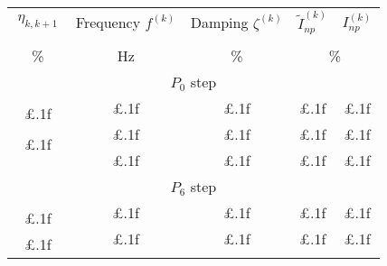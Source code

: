 \documentclass[11pt]{article}
\begin{document}
\renewcommand{\tabcolsep}{10 pt}
\renewcommand{\arraystretch}{.55}




\begin{table}
\centering
\begin{tabular}{|ccccc|}
\hline
\multicolumn{1}{|c|}{\multirow{2.5}{*}{$\ \eta_{k, k+1}\ $}} & 
\multicolumn{1}{c|}{\multirow{2.5}{*}{Frequency $f^{(k)}$}} & 
\multicolumn{1}{c|}{\multirow{2.5}{*}{Damping $\zeta^{(k)}$}} & 
\multicolumn{1}{c}{\multirow{2.5}{*}{$\tilde I_{np}^{(k)}$}} & 
\multirow{2.5}{*}{$I_{np}^{(k)}$} \\
\multicolumn{1}{|c|}{} & \multicolumn{1}{c|}{} & \multicolumn{1}{c|}{} & \multicolumn{2}{c|}{} \\
\multicolumn{1}{|c|}{\multirow{2}{*}{\%}} & 
\multicolumn{1}{c|}{\multirow{2}{*}{Hz}} & 
\multicolumn{1}{c|}{\multirow{2}{*}{\%}} & 
\multicolumn{2}{c|}{\multirow{2}{*}{\%}} \\
\multicolumn{1}{|c|}{} & \multicolumn{1}{c|}{} & \multicolumn{1}{c|}{} & & \\ \hline \hline
\multicolumn{5}{|c|}{\multirow{2}{*}{$P_0$ step}} \\
\multicolumn{5}{|c|}{} \\ \hline
 & \multirow{2}{*}{£.1f} & \multirow{2}{*}{£.1f} & \multirow{2}{*}{£.1f} & \multirow{2}{*}{£.1f} \\ %
\multirow{2}{*}{£.1f} & & & & \\ \cline{2-5} 
 & \multirow{2}{*}{£.1f} & \multirow{2}{*}{£.1f} & \multirow{2}{*}{£.1f} & \multirow{2}{*}{£.1f} \\ %
\multirow{2}{*}{£.1f} & & & & \\ \cline{2-5} 
 & \multirow{2}{*}{£.1f} & \multirow{2}{*}{£.1f} & \multirow{2}{*}{£.1f} & \multirow{2}{*}{£.1f} \\ %
 & & & & \\ \hline \hline
\multicolumn{5}{|c|}{\multirow{2}{*}{$P_6$ step}} \\
\multicolumn{5}{|c|}{} \\ \hline
 & \multirow{2}{*}{£.1f} & \multirow{2}{*}{£.1f} & \multirow{2}{*}{£.1f} & \multirow{2}{*}{£.1f} \\ %
\multirow{2}{*}{£.1f} & & & & \\ \cline{2-5} 
 & \multirow{2}{*}{£.1f} & \multirow{2}{*}{£.1f} & \multirow{2}{*}{£.1f} & \multirow{2}{*}{£.1f} \\ %
\multirow{2}{*}{£.1f} & & & & \\ \cline{2-5} 

\end{tabular}
\end{table}
\end{document}
